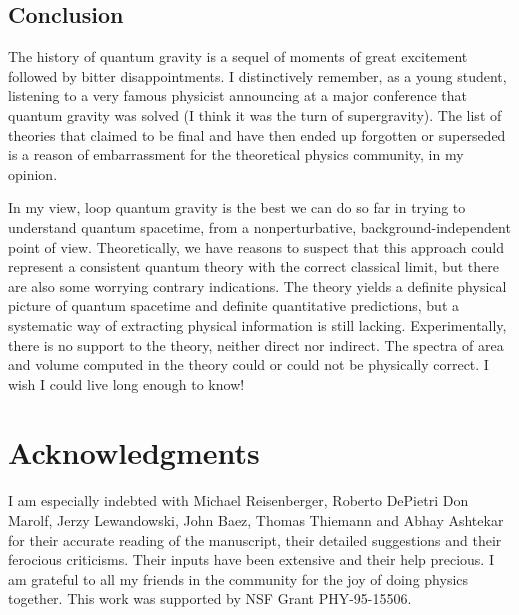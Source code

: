 \documentclass[12pt]{article}
\begin{document}
\subsection{Conclusion}\label{9} 

The history of quantum gravity is a sequel of moments of great 
excitement followed by bitter disappointments.  I distinctively 
remember, as a young student, listening to a very famous physicist 
announcing at a major conference that quantum gravity was solved (I 
think it was the turn of supergravity).  The list of theories that 
claimed to be final and have then ended up forgotten or superseded is 
a reason of embarrassment for the theoretical physics community, in my 
opinion.

In my view, loop quantum gravity is the best we can do so far in 
trying to understand quantum spacetime, from a nonperturbative, 
background-independent point of view.  Theoretically, we have reasons 
to suspect that this approach could represent a consistent quantum 
theory with the correct classical limit, but there are also some 
worrying contrary indications.  The theory yields a definite physical 
picture of quantum spacetime and definite quantitative predictions, 
but a systematic way of extracting physical information is still 
lacking.  Experimentally, there is no support to the theory, neither 
direct nor indirect.  The spectra of area and volume computed in the 
theory could or could not be physically correct.  I wish I could live 
long enough to know!


\section*{Acknowledgments}

I am especially indebted with Michael Reisenberger, Roberto DePietri 
Don Marolf, Jerzy Lewandowski, John Baez, Thomas Thiemann and Abhay 
Ashtekar for their accurate reading of the manuscript, their detailed 
suggestions and their ferocious criticisms.  Their inputs have been 
extensive and their help precious.  I am grateful to all my friends in 
the community for the joy of doing physics together.  This work was 
supported by NSF Grant PHY-95-15506.


\end{document}
